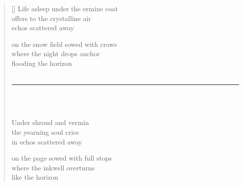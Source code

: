 \documentclass[12pt,a4paper]{article}
\begin{document}
\thispagestyle{empty}

\poemtitle{}

\settowidth{\versewidth}{on the page sowed with full stops}

\bigskip

\begin{verse}[\versewidth]
  Life asleep under the ermine coat \\
  offers to the crystalline air \\
  echos scattered away

  on the snow field sowed with crows \\
  where the night drops anchor \\
  flooding the horizon \\ \

  \rule{0.4\textwidth}{0.4pt}
  \\ \

  Under shroud and vermin \\
  the yearning soul cries \\
  in echos scattered away

  on the page sowed with full stops \\
  where the inkwell overturns \\
  like the horizon
\end{verse}
\end{document}
